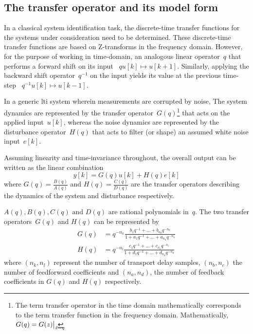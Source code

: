 
\subsection{The transfer operator and its model form}
In a classical system identification  task, the discrete-time transfer functions
for the systems  under consideration need to be  determined. These discrete-time
transfer functions are  based on Z-transforms in the  frequency domain. However,
for the purpose of working in time-domain, an analogous linear operator~$q$ that
performs a  forward shift on  its input \ie~$  {q u[k] \longmapsto  u[k+1]} $.
Similarly, applying the  backward shift operator~$ q^{-1} $  on the input yields
its value at the previous time-step \ie~$ {q^{-1} u[k] \longmapsto u[k-1]}$.


In a generic  \gls{lti} system wherein measurements are corrupted  by noise, The
system  dynamics are  represented by  the transfer  operator~$G(q)$\footnote{The
term  transfer operator  in the  time domain  mathematically corresponds  to the
term  transfer  function  in  the  frequency  domain.  Mathematically,~${G(q)  =
G(z)\bigr\rvert_{\mathrlap{z=q}}}$.}  that  acts  on the  applied  input~$u[k]$,
whereas the  noise dynamics are  represented by the  disturbance operator~$H(q)$
that acts to filter (or shape) an assumed white noise input~$e[k]$.

Assuming linearity and time-invariance throughout, the overall output can be
written as the linear combination
\begin{equation}\label{eq:outputwithsysandnoise}
    y[k] = G(q)u[k] + H(q)e[k]
\end{equation}
where ${G(q) = \frac{B(q)}{A(q)}}$ and ${H(q) = \frac{C(q)}{D(q)}}$ are the transfer
operators describing the dynamics of the system and disturbance respectively.

${A(q), B(q), C(q) \text{ and } D(q)}$ are rational polynomials in~$q$. The two transfer
operators~$G(q)$ and $H(q)$ can be represented by
\begin{align}
    G(q) &= q^{-n_k}\frac{b_1q^{-1} + \dots  + b_{n_b}q^{-{n_b}}}{1 + a_1q^{-1} + \dots  + a_{n_a}q^{-{n_a}}} \\
    H(q) &= q^{-n_l}\frac{c_1q^{-1} + \dots  + c_{n_c}q^{-{n_c}}}{1 + d_1q^{-1} + \dots  + d_{n_d}q^{-{n_d}}}
\end{align}
where ${(n_k,n_l)}$ represent  the number of transport  delay samples, $(n_b,n_c)$
the number  of feedforward coefficients  and ${(n_a,n_d)}$, the number  of feedback
coefficients in $G(q)$ and $H(q)$ respectively.


